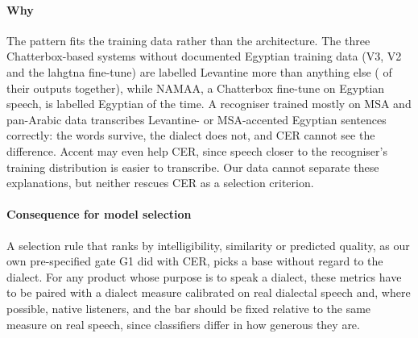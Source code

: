 \begin{table}[t]
\centering\small
\caption{Two markers of Egyptian Arabic in the outputs, from a multilingual phone recogniser: the share of [g] among the
recognised [g], [] and [] in clips whose text contains jiim (Egyptian [g]; MSA, Levantine and Gulf [] or []), and
recognised [q] per qaaf letter (Egyptian []; MSA [q]). Two-way bootstrap 95\% intervals over sentences and voices
(real and reference speech: over clips). Added after the main results.}
\label{tab:features}

\end{table}

\paragraph{Why}
The pattern fits the training data rather than the architecture. The three Chatterbox-based systems without documented
Egyptian training data (V3, V2 and the lahgtna fine-tune) are labelled Levantine more than anything else
( of their outputs together), while NAMAA, a Chatterbox fine-tune on Egyptian speech, is labelled
Egyptian  of the time. A recogniser trained mostly on MSA and pan-Arabic data transcribes Levantine-
or MSA-accented Egyptian sentences correctly: the words survive, the dialect does not, and CER cannot see the
difference. Accent may even help CER, since speech closer to the recogniser's training distribution is easier to
transcribe. Our data cannot separate these explanations, but neither rescues CER as a selection criterion.

\paragraph{Consequence for model selection}
A selection rule that ranks by intelligibility, similarity or predicted quality, as our own pre-specified gate G1 did
with CER, picks a base without regard to the dialect. For any product whose purpose is to speak a dialect, these
metrics have to be paired with a dialect measure calibrated on real dialectal speech and, where possible, native
listeners, and the bar should be fixed relative to the same measure on real speech, since classifiers differ in how
generous they are.
